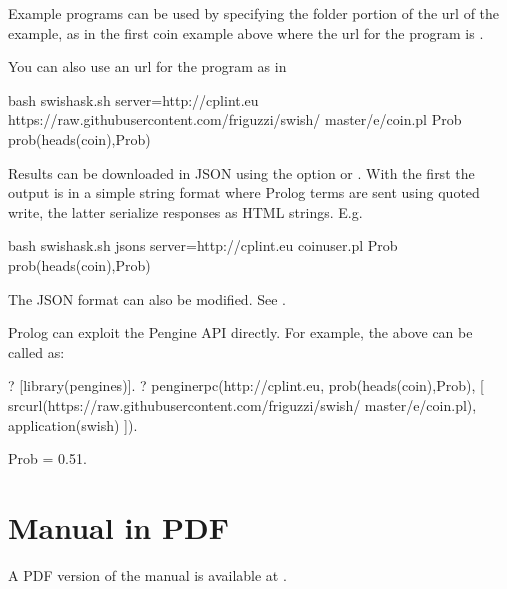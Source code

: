 \documentclass[letterpaper,10pt,english]{sphinxmanual}
\begin{document}
Example programs can be used by specifying the folder portion of the url of the example, as in the first coin example above where the url for the program is .

You can also use an url for the program as in

\begin{sphinxVerbatim}[commandchars=\\\{\}]
\PYGZdl{} bash swish\PYGZhy{}ask.sh \PYGZhy{}\PYGZhy{}server=http://cplint.eu \PYGZbs{}
https://raw.githubusercontent.com/friguzzi/swish/\PYGZbs{}
master/e/coin.pl Prob \PYGZdq{}prob(heads(coin),Prob)\PYGZdq{}
\end{sphinxVerbatim}

Results can be downloaded in JSON using the option  or . With the first the output is in a simple string format where Prolog terms are sent using quoted write, the latter serialize responses as HTML strings.
E.g.

\begin{sphinxVerbatim}[commandchars=\\\{\}]
\PYGZdl{} bash swish\PYGZhy{}ask.sh \PYGZhy{}\PYGZhy{}json\PYGZhy{}s \PYGZhy{}\PYGZhy{}server=http://cplint.eu \PYGZbs{}
        coin\PYGZus{}user.pl Prob \PYGZdq{}prob(heads(coin),Prob)\PYGZdq{}
\end{sphinxVerbatim}

The JSON format can also be modified.
See .

Prolog can exploit the Pengine API directly. For example, the above can be called as:

\begin{sphinxVerbatim}[commandchars=\\\{\}]
?\PYGZhy{} [library(pengines)].
?\PYGZhy{} pengine\PYGZus{}rpc(\PYGZsq{}http://cplint.eu\PYGZsq{},
        prob(heads(coin),Prob),
        [ src\PYGZus{}url(\PYGZsq{}https://raw.githubusercontent.com/friguzzi/swish/\PYGZbs{}
                master/e/coin.pl\PYGZsq{}),
                application(swish)
]).

Prob = 0.51.
\end{sphinxVerbatim}


\chapter{Manual in PDF}
\label{\detokenize{index:manual-in-pdf}}
A PDF version of the manual is available at .
\end{document}
